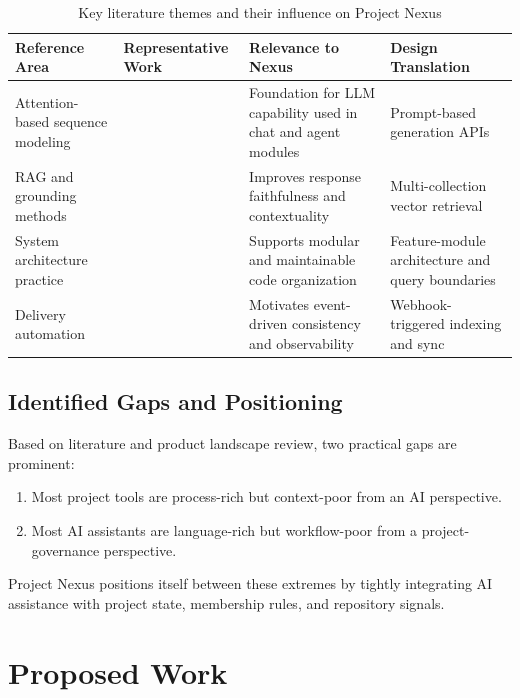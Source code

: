 \documentclass[a4paper, 11pt, oneside]{Dissertation}
\begin{document}
\begin{table}[H]
\centering
\begin{tabular}{|L{3.2cm}|L{3.2cm}|L{4.0cm}|L{2.7cm}|}
\hline
\textbf{Reference Area} & \textbf{Representative Work} & \textbf{Relevance to Nexus} & \textbf{Design Translation} \\
\hline
Attention-based sequence modeling & \cite{vaswani2017attention} & Foundation for LLM capability used in chat and agent modules & Prompt-based generation APIs \\
\hline
RAG and grounding methods & \cite{lewis2020rag,gao2023retrieval} & Improves response faithfulness and contextuality & Multi-collection vector retrieval \\
\hline
System architecture practice & \cite{bass2021software} & Supports modular and maintainable code organization & Feature-module architecture and query boundaries \\
\hline
Delivery automation & \cite{humble2010continuous} & Motivates event-driven consistency and observability & Webhook-triggered indexing and sync \\
\hline
\end{tabular}
\caption{Key literature themes and their influence on Project Nexus}
\label{tab:literature-summary}
\end{table}

\FloatBarrier

\section{Identified Gaps and Positioning}
Based on literature and product landscape review, two practical gaps are prominent:

\begin{enumerate}
\item Most project tools are process-rich but context-poor from an AI perspective.
\item Most AI assistants are language-rich but workflow-poor from a project-governance perspective.
\end{enumerate}

Project Nexus positions itself between these extremes by tightly integrating AI assistance with project state, membership rules, and repository signals.

\chapter{Proposed Work}
\label{ch:new}
\end{document}
